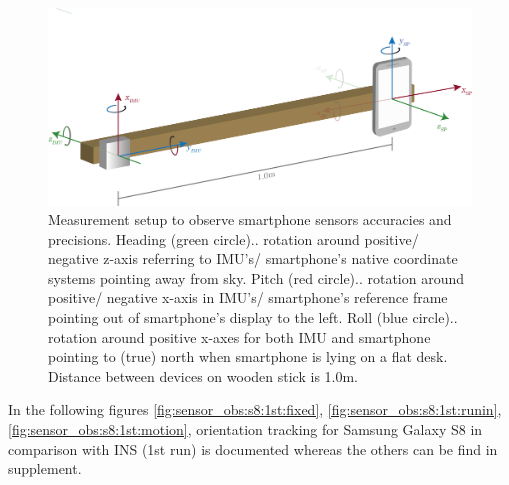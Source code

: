 \documentclass[review]{elsarticle}
\begin{document}
\begin{figure}[htbp!]
\begin{center}
	\centering
	\includegraphics[keepaspectratio, width=1\columnwidth]{graphics/sensor_construction}
	\caption{Measurement setup to observe smartphone sensors accuracies and precisions. Heading (green circle).. rotation around positive/ negative z-axis referring to \gls{IMU}'s/ smartphone's native coordinate systems pointing away from sky. Pitch (red circle).. rotation around positive/ negative x-axis in \gls{IMU}'s/ smartphone's reference frame pointing out of smartphone's display to the left. Roll (blue circle).. rotation around positive x-axes for both \gls{IMU} and smartphone pointing to (true) north when smartphone is lying on a flat desk. Distance between devices on wooden stick is 1.0m.}
	\label{fig:technology:sensor:construction}
\end{center}
\end{figure}

In the following figures \ref{fig:sensor_obs:s8:1st:fixed}, \ref{fig:sensor_obs:s8:1st:runin}, \ref{fig:sensor_obs:s8:1st:motion}, orientation tracking for Samsung Galaxy S8 in comparison with \gls{INS} (1st run) is documented whereas the others can be find in supplement. 
\end{document}
